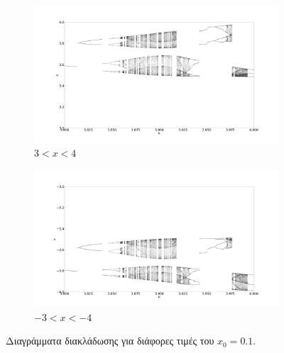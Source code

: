 \begin{figure}[ht]
	\centering
	
	\begin{subfigure}[b]{0.8\textwidth}
		\centering
		\includegraphics[width=\textwidth]{LateX images/sine q=-0.5/g3}
		\caption{$3<x<4$}
		\label{f:g52}
	\end{subfigure}
	\hfill
	\begin{subfigure}[b]{0.8\textwidth}
		\centering
		\includegraphics[width=\textwidth]{LateX images/sine q=-0.5/g3.2}
		\caption{$-3<x<-4$}
		\label{f:g533}
	\end{subfigure}
	
	\caption{Διαγράμματα διακλάδωσης για διάφορες τιμές του $x_0=0.1$. }
	\label{f:g237}
\end{figure}
